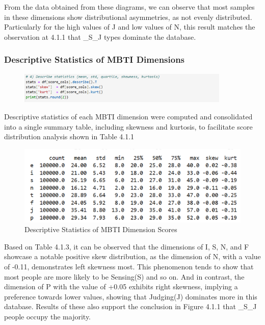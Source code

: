 \documentclass[12pt]{article}
\begin{document}
	From the data obtained from these diagrams, we can observe that most samples in these dimensions show distributional asymmetries, as not evenly distributed. Particularly for the high values of J and low values of N, this result matches the observation at 4.1.1 that \_S\_J types dominate the database.
	
	\subsubsection{Descriptive Statistics of MBTI Dimensions}
	\begin{figure}[H]
	\centering
	\includegraphics[width=0.9\textwidth]{Q1EDA5}
	
	\end{figure}	
	
	Descriptive statistics of each MBTI dimension were computed and consolidated into a single summary table, including skewness and kurtosis, to facilitate score distribution analysis shown in Table 4.1.1
	\begin{figure}[H]
		\centering
		\includegraphics{Q1EDA6} 
		\caption{Descriptive Statistics of MBTI Dimension Scores}		
	\end{figure}
	
	Based on Table 4.1.3, it can be observed that the dimensions of I, S, N, and F showcase a notable positive skew distribution, as the dimension of N, with a value of -0.11, demonstrates left skewness most. This phenomenon tends to show that most people are more likely to be Sensing(S) and so on. And in contrast, the dimension of P with the value of +0.05 exhibits right skewness, implying a preference towards lower values, showing that Judging(J) dominates more in this database. Results of these also support the conclusion in Figure 4.1.1 that \_S\_J people occupy the majority.
	
\end{document}
